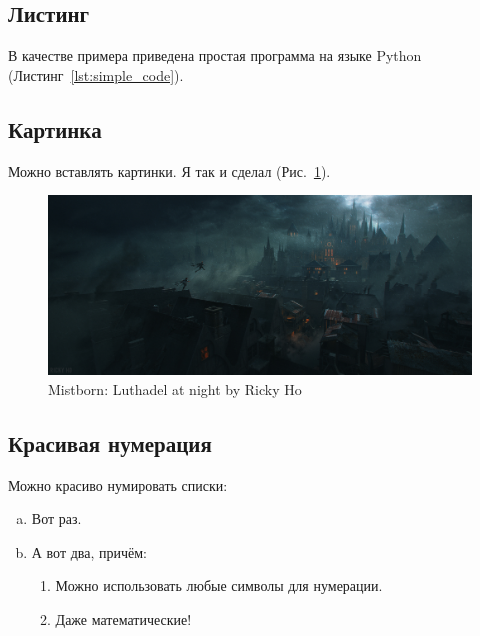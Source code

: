 \documentclass[12pt,a4paper]{article}
\begin{document}
\subsection{Листинг}

В качестве примера приведена простая программа на языке Python (Листинг~\ref{lst:simple_code}). 

\label{lst:simple_code}

\newpage


\subsection{Картинка}

Можно вставлять картинки. Я так и сделал (Рис.~\ref{pic:luthadel}).
\begin{figure}[!h]
	\centering
	\includegraphics[width=1.0\textwidth]{pic/ricky-ho-mistborn-luthadel-city-rickyho}
	\caption{Mistborn: Luthadel at night by Ricky Ho}
	\label{pic:luthadel}
\end{figure}


\subsection{Красивая нумерация}

Можно красиво нумировать списки:

\begin{enumerate}[(a)]
    \item Вот раз.
    \item А вот два, причём:
    \begin{enumerate}[1 $\to$]
    	\item Можно использовать любые символы для нумерации.
    	\item Даже математические!
    \end{enumerate}
\end{enumerate}
\end{document}
